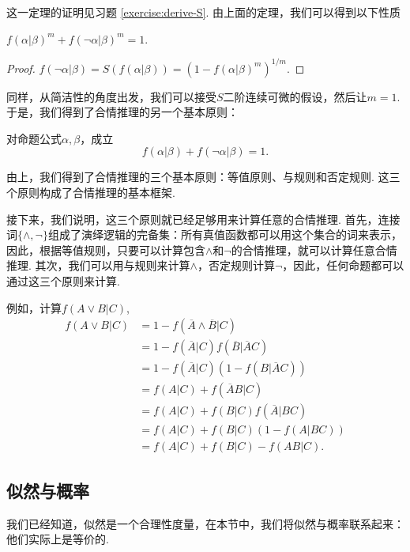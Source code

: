 这一定理的证明见习题 \ref{exercise:derive-S}. 由上面的定理，我们可以得到以下性质
\begin{corollary}
    $f(\alpha|\beta)^m + f(\neg\alpha|\beta)^m = 1$.
\end{corollary}
\begin{proof}
    $f(\neg\alpha|\beta) = S(f(\alpha|\beta)) = (1 - f(\alpha|\beta)^m)^{1/m}$.
\end{proof}

同样，从简洁性的角度出发，我们可以接受$S$二阶连续可微的假设，然后让$m=1$. 于是，我们得到了合情推理的另一个基本原则：
\begin{principle}[否定规则]
对命题公式$\alpha,\beta$，成立
\[f(\alpha|\beta) + f(\neg\alpha|\beta) = 1.\]
\end{principle}

由上，我们得到了合情推理的三个基本原则：等值原则、与规则和否定规则. 这三个原则构成了合情推理的基本框架.

接下来，我们说明，这三个原则就已经足够用来计算任意的合情推理. 首先，连接词$\{\wedge,\neg\}$组成了演绎逻辑的完备集：所有真值函数都可以用这个集合的词来表示，因此，根据等值规则，只要可以计算包含$\wedge$和$\neg$的合情推理，就可以计算任意合情推理. 其次，我们可以用与规则来计算$\wedge$，否定规则计算$\neg$，因此，任何命题都可以通过这三个原则来计算.

\begin{example}
    例如，计算$f(A\vee B|C)$,
        \begin{align*}
            f(A \vee B|C) 
            &= 1 - f(\overline{A}\wedge\overline{B}|C)\\
            & = 1 - f(\overline{A}|C)f(\overline{B}|\overline{A}C) \\
            &= 1 - f(\overline{A}|C)(1 - f(B|\overline{A}C))\\
            &= f(A|C) + f(\overline{A}B|C) \\
            &= f(A|C) + f(B|C)f(\overline{A}|BC) \\
            &= f(A|C) + f(B|C)(1 - f(A|BC))\\
            &= f(A|C) + f(B|C) - f(AB|C).
        \end{align*}
\end{example}


\subsection{似然与概率}
我们已经知道，似然是一个合理性度量，在本节中，我们将似然与概率联系起来：他们实际上是等价的.

